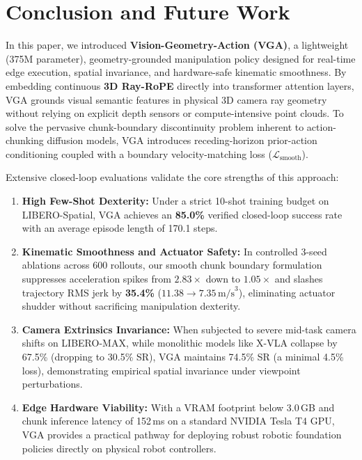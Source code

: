 \FloatBarrier
\section{Conclusion and Future Work}
\label{sec:conclusion}

In this paper, we introduced \textbf{Vision-Geometry-Action (VGA)}, a lightweight (375M parameter), geometry-grounded manipulation policy designed for real-time edge execution, spatial invariance, and hardware-safe kinematic smoothness. By embedding continuous \textbf{3D Ray-RoPE} directly into transformer attention layers, VGA grounds visual semantic features in physical 3D camera ray geometry without relying on explicit depth sensors or compute-intensive point clouds. To solve the pervasive chunk-boundary discontinuity problem inherent to action-chunking diffusion models, VGA introduces receding-horizon prior-action conditioning coupled with a boundary velocity-matching loss ($\mathcal{L}_{\text{smooth}}$).

Extensive closed-loop evaluations validate the core strengths of this approach:
\begin{enumerate}
    \item \textbf{High Few-Shot Dexterity:} Under a strict 10-shot training budget on LIBERO-Spatial, VGA achieves an \textbf{85.0\%} verified closed-loop success rate with an average episode length of 170.1 steps.
    \item \textbf{Kinematic Smoothness and Actuator Safety:} In controlled 3-seed ablations across 600 rollouts, our smooth chunk boundary formulation suppresses acceleration spikes from $2.83\times$ down to \textbf{$1.05\times$} and slashes trajectory RMS jerk by \textbf{35.4\%} ($11.38 \rightarrow 7.35\,\text{m/s}^3$), eliminating actuator shudder without sacrificing manipulation dexterity.
    \item \textbf{Camera Extrinsics Invariance:} When subjected to severe mid-task camera shifts on LIBERO-MAX, while monolithic models like X-VLA collapse by 67.5\% (dropping to 30.5\% SR), VGA maintains 74.5\% SR (a minimal 4.5\% loss), demonstrating empirical spatial invariance under viewpoint perturbations.
    \item \textbf{Edge Hardware Viability:} With a VRAM footprint below 3.0\,GB and chunk inference latency of 152\,ms on a standard NVIDIA Tesla T4 GPU, VGA provides a practical pathway for deploying robust robotic foundation policies directly on physical robot controllers.
\end{enumerate}

